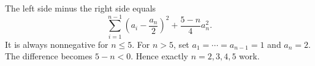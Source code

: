 The left side minus the right side equals \[\sum_{i=1}^{n-1}\left(a_i-\dfrac{a_n}{2}\right)^2+\dfrac{5-n}{4}a_n^2.\]It is always nonnegative for $ n\le5 $. For $ n>5 $, set $ a_1=\cdots=a_{n-1}=1 $ and $ a_n=2 $. The difference becomes $ 5-n<0 $. Hence exactly $\boxed{n=2,3,4,5}$ work.

